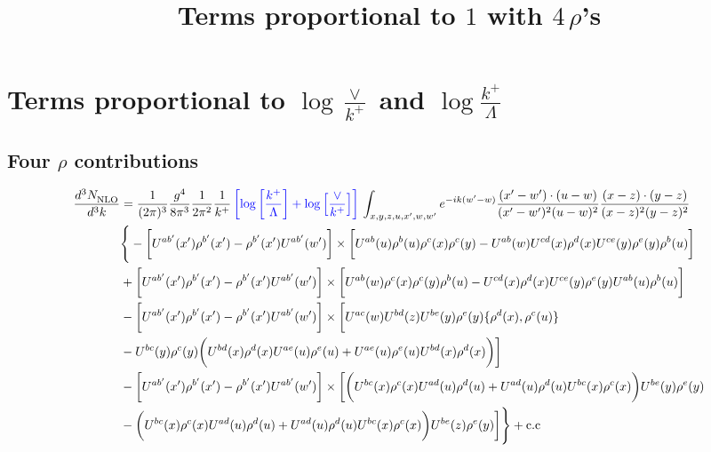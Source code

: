 \documentclass[aps,prd,amsmath,amssymb,nofootinbib]{revtex4-2}
\title{Terms proportional to $1$ with $4\, \rho$'s}
\numberwithin{equation}{section}
\begin{document}
\section{Terms proportional to $\log{\frac{\vee}{k^{+}}}$ and $\log{\frac{k^{+}}{\Lambda}}$}
\subsection{Four $\rho$ contributions}
\begin{align} \label{eq:4rho}
    \frac{d^{3}N_{\rm NLO}^{\rm}}{d^{3}k}  & = \frac{1}{(2\pi)^{3}}\frac{g^{4}}{8\pi^{3}}\frac{1}{2\pi^{2}} \frac{1}{k^{+}}\,{\color{blue}\left[\log{\left[\frac{k^{+}}{\Lambda}\right]}+\log{\left[\frac{\vee}{k^{+}}\right]}\right]}\,\int_{x,y,z,u,x^{\prime},w,w^{\prime}}e^{-ik(w^{\prime}-w)}\frac{(x^{\prime}-w^{\prime})\cdot (u-w)}{(x^{\prime}-w^{\prime})^{2} (u-w)^{2}} \frac{(x-z)\cdot (y-z)}{(x-z)^{2}(y-z)^{2}}\notag \\ & \Bigg\{-\bigg[U^{ab^{\prime}}(x^{\prime})\rho^{b^{\prime}}(x^{\prime})-\rho^{b^{\prime}}(x^{\prime})U^{ab^{\prime}}(w^{\prime})\bigg]\times\bigg[U^{ab}(u)\rho^{b}(u)\rho^{c}(x)\rho^{c}(y)-U^{ab}(w)U^{cd}(x)\rho^{d}(x)U^{ce}(y)\rho^{e}(y)\rho^{b}(u)\bigg]\notag \\ & + \bigg[U^{ab^{\prime}}(x^{\prime})\rho^{b^{\prime}}(x^{\prime})-\rho^{b^{\prime}}(x^{\prime})U^{ab^{\prime}}(w^{\prime})\bigg]\times \bigg[U^{ab}(w)\rho^{c}(x)\rho^{c}(y)\rho^{b}(u)-U^{cd}(x)\rho^{d}(x)U^{ce}(y)\rho^{e}(y)U^{ab}(u)\rho^{b}(u)\bigg]\notag \\ & 
    -\bigg[U^{ab^{\prime}}(x^{\prime})\rho^{b^{\prime}}(x^{\prime})-\rho^{b^{\prime}}(x^{\prime})U^{ab^{\prime}}(w^{\prime})\bigg]\times \bigg[U^{ac}(w)U^{bd}(z)U^{be}(y)\rho^{e}(y)\{\rho^{d}(x),\rho^{c}(u)\}\notag \\ &-U^{bc}(y)\rho^{c}(y)\bigg(U^{bd}(x)\rho^{d}(x) U^{ae}(u)\rho^{e}(u)+U^{ae}(u)\rho^{e}(u)U^{bd}(x)\rho^{d}(x)\bigg)\bigg]\notag \\ & - \bigg[U^{ab^{\prime}}(x^{\prime})\rho^{b^{\prime}}(x^{\prime})-\rho^{b^{\prime}}(x^{\prime})U^{ab^{\prime}}(w^{\prime})\bigg]\times \bigg[\bigg(U^{bc}(x)\rho^{c}(x)U^{ad}(u)\rho^{d}(u)+U^{ad}(u)\rho^{d}(u)U^{bc}(x)\rho^{c}(x)\bigg)U^{be}(y)\rho^{e}(y)\notag \\ & -\bigg(U^{bc}(x)\rho^{c}(x)U^{ad}(u)\rho^{d}(u)+U^{ad}(u)\rho^{d}(u)U^{bc}(x)\rho^{c}(x)\bigg)U^{be}(z)\rho^{e}(y)\bigg]\Bigg\}+\rm{c.c} \notag \\ & 

\end{align}
\end{document}

